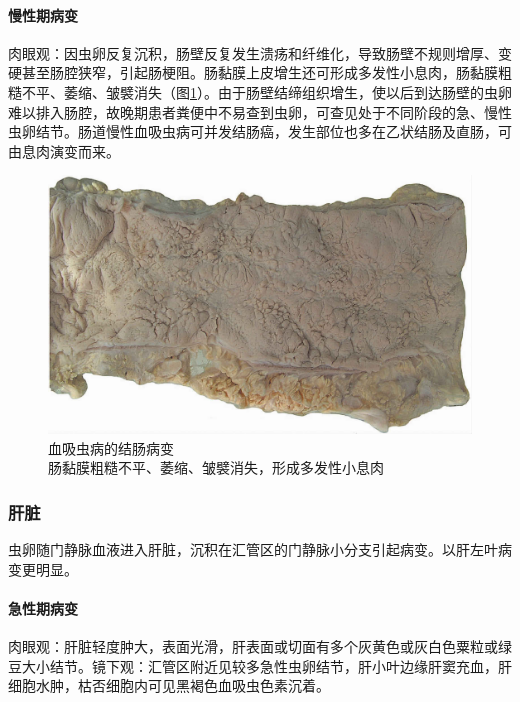 \paragraph{慢性期病变}
肉眼观：因虫卵反复沉积，肠壁反复发生溃疡和纤维化，导致肠壁不规则增厚、变硬甚至肠腔狭窄，引起肠梗阻。肠黏膜上皮增生还可形成多发性小息肉，肠黏膜粗糙不平、萎缩、皱襞消失（图\ref{fig15-6}）。由于肠壁结缔组织增生，使以后到达肠壁的虫卵难以排入肠腔，故晚期患者粪便中不易查到虫卵，可查见处于不同阶段的急、慢性虫卵结节。肠道慢性血吸虫病可并发结肠癌，发生部位也多在乙状结肠及直肠，可由息肉演变而来。

\begin{figure}[!htbp]
 \centering
 \includegraphics{./images/Image00250.jpg}
 \captionsetup{justification=centering}
 \caption{血吸虫病的结肠病变\\ {\small 肠黏膜粗糙不平、萎缩、皱襞消失，形成多发性小息肉}}
\label{fig15-6}
  \end{figure}

\subsubsection{肝脏}

虫卵随门静脉血液进入肝脏，沉积在汇管区的门静脉小分支引起病变。以肝左叶病变更明显。

\paragraph{急性期病变}
肉眼观：肝脏轻度肿大，表面光滑，肝表面或切面有多个灰黄色或灰白色粟粒或绿豆大小结节。镜下观：汇管区附近见较多急性虫卵结节，肝小叶边缘肝窦充血，肝细胞水肿，枯否细胞内可见黑褐色血吸虫色素沉着。

